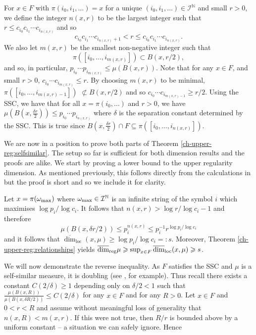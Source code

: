 For $x\in F$ with $\pi(i_0, i_1, \dots)=x$ for a unique $(i_0,i_1,\dots) \in \mathcal{I}^\mathbb{N}$ and small $r>0$, we define the integer $n(x,r)$ to be the largest integer such that $r \le c_{i_0}c_{i_1} \cdots c_{i_{n(x,r)}}$ and so
\[
c_{i_0}c_{i_1} \cdots c_{i_{n(x,r)}+1} < r \le c_{i_0}c_{i_1} \cdots c_{i_{n(x,r)}}.
\]
We also let $m(x,r)$ be the smallest non-negative  integer such that 
$$
\pi([i_0,\ldots, i_{m(x,r)}])\subset B(x,r/2),
$$
and so, in particular,  $p_{i_0}\cdots p_{i_{m(x,r)}} \le \mu (B(x,r))$.  Note that for any $x \in F$, and small $ r>0$,  $c_{i_0} \cdots c_{i_{m(x,r)}} \leq r$. By choosing $m(x,r)$ to be minimal,  $\pi([i_0,\ldots, i_{m(x,r)-1}])$ $\not\subset B(x,r/2)$ and so $c_{i_0} \cdots c_{i_{m(x,r)-1}} \ge r/2$. Using the SSC, we have that for all $x=\pi(i_0,\ldots)$ and  $r>0$, we have $\mu(B(x,\frac{\delta r}{2}))\le p_{i_0}\cdots p_{i_{n(x,r)}}$ where $\delta$ is the separation constant determined by the SSC. This is true since $B(x, \frac{\delta r}{2}) \cap F  \subseteq \pi([i_0,\ldots, i_{n(x,r)}])$.

We are now in a position to prove both parts of Theorem \ref{ch-upper-reg:selfsimilar}. The setup so far is sufficient for both dimension results and the proofs are alike. We start by proving a lower bound to the upper regularity dimension. As mentioned previously, this follows directly from the calculations in \cite{cawley-mauldin} but the proof is short and so we include it for clarity.

Let $x = \pi(\omega_\textup{max})$ where $\omega_\textup{max} \in \mathcal{I}^{\mathbb{N}}$ is an infinite string of the symbol  $i$ which maximises $\log p_i/\log c_i$. It follows that $n(x,r) > \log r / \log {c_i} - 1$ and therefore
\[
\mu(B(x,\delta r/2)) \le p_{i}^{n(x,r)} \leq p_i^{-1} r^{\log p_i/\log c_i}
\]
and it follows that $\overline{\dim}_{\text{loc}}(x,\mu) \geq \log p_i/\log c_i = \colon s$.  Moreover, Theorem \ref{ch-upper-reg:relationships} yields  $ \overline{\dim}_{\textup{reg}} \mu  \geqslant \sup_{x\in F} \overline{\dim}_{\text{loc}}(x,\mu) \geqslant  s$.  


We will now demonstrate the reverse inequality. As $F$ satisfies the SSC and $\mu$ is a self-similar measure, it is doubling (see \cite{olsenformalism}, for example). Thus recall there exists a constant $C(2/\delta) \geq 1$ depending only on $\delta/2 < 1$ such that $\frac{\mu(B(x, R))}{\mu(B(x,\delta R/2))}\le C(2/\delta)$ for any $x\in F$ and for any $R>0$.  Let $x \in F$ and $0<r<R$ and assume without meaningful loss of generality that $n(x,R) < m(x,r)$. If this were not true, then $R/r$ is bounded above by a uniform constant -- a situation we can safely ignore.  Hence

